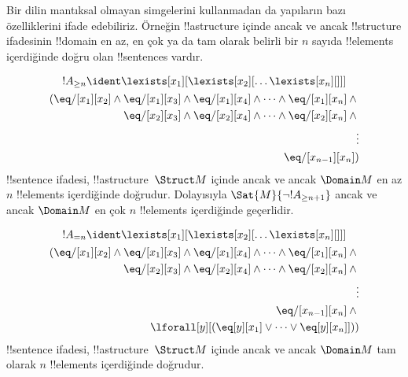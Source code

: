 \documentclass[../../../include/open-logic-section]{subfiles}
\begin{document}


\begin{explain}
Bir dilin mantıksal olmayan simgelerini kullanmadan da yapıların bazı
özelliklerini ifade edebiliriz. Örneğin !!a{structure} içinde ancak ve
ancak !!{structure} ifadesinin !!{domain} en az, en çok ya da tam
olarak belirli bir $n$ sayıda !!{element}s içerdiğinde doğru olan
!!{sentence}s vardır.
\end{explain}

\begin{prop}
\begin{multline*}
  !A_{\ge n} \ident \lexists[x_1][\lexists[x_2][\dots\lexists[x_n][{}]]]\\
  \begin{aligned}
  (\eq/[x_1][x_2] \land {}
  \eq/[x_1][x_3] \land \eq/[x_1][x_4] \land \dots \land \eq/[x_1][x_n] \land {}\\
\eq/[x_2][x_3] \land \eq/[x_2][x_4] \land \dots \land {} \eq/[x_2][x_n] \land {} \\
\vdots\\
\eq/[x_{n-1}][x_n])
\end{aligned}
\end{multline*}
!!{sentence} ifadesi, !!a{structure}~$\Struct M$ içinde ancak ve ancak
$\Domain M$ en az $n$ !!{element}s içerdiğinde doğrudur. Dolayısıyla
$\Sat{M}{\lnot !A_{\ge n+1}}$ ancak ve ancak $\Domain M$ en çok $n$
!!{element}s içerdiğinde geçerlidir.
\end{prop}

\begin{prop}
\begin{multline*}
!A_{= n} \ident \lexists[x_1][\lexists[x_2][\dots\lexists[x_n][{}]]] \\
\begin{aligned}
  (\eq/[x_1][x_2] \land {}
  \eq/[x_1][x_3] \land \eq/[x_1][x_4] \land \dots \land \eq/[x_1][x_n] \land {}\\
\eq/[x_2][x_3] \land \eq/[x_2][x_4] \land \dots \land {} \eq/[x_2][x_n] \land {} \\
\vdots\\
\eq/[x_{n-1}][x_n] \land {} \\
\lforall[y][(\eq[y][x_1] \lor \dots \lor \eq[y][x_n]]))
\end{aligned}
\end{multline*}
!!{sentence} ifadesi, !!a{structure}~$\Struct M$ içinde ancak ve ancak
$\Domain M$ tam olarak $n$ !!{element}s içerdiğinde doğrudur.
\end{prop}
\end{document}
